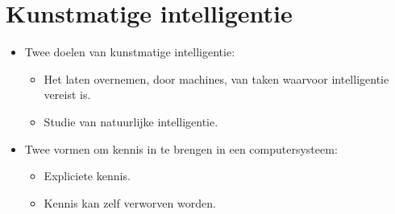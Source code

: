 \chapter{Kunstmatige intelligentie}
	\begin{itemize}
		\item Twee doelen van kunstmatige intelligentie:
			\begin{itemize}
			\item Het laten overnemen, door machines, van taken waarvoor intelligentie vereist is.
			\item Studie van natuurlijke intelligentie.
			\end{itemize}
		\item Twee vormen om kennis in te brengen in een computersysteem:
			\begin{itemize}
				\item Expliciete kennis.
				\item Kennis kan zelf verworven worden.
			\end{itemize}
	\end{itemize}
